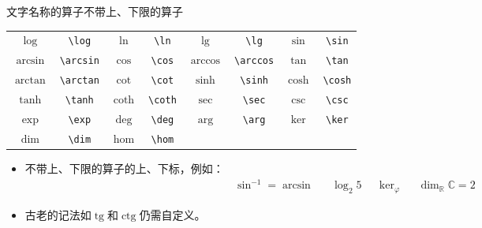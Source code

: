 \documentclass[mathserif]{beamer}
\newcommand{\real}{\mathbb R}
\newcommand{\complex}{\mathbb C}
\DeclareMathOperator{\tg}{tg}
\DeclareMathOperator{\ctg}{ctg}
\begin{document}
\begin{frame}[fragile]{文字名称的算子}{不带上、下限的算子}
\begin{table}[H]
\centering
\begin{tabular}{cc|cc|cc|cc}
	\toprule
	$\log$ & \lstinline'\log' & $\ln$ & \lstinline'\ln' & $\lg$ & \lstinline'\lg' & $\sin$ & \lstinline'\sin' \\
	$\arcsin$ & \lstinline'\arcsin' & $\cos$ & \lstinline'\cos' & $\arccos$ & \lstinline'\arccos' & $\tan$ & \lstinline'\tan' \\
	$\arctan$ & \lstinline'\arctan' & $\cot$ & \lstinline'\cot' & $\sinh$ & \lstinline'\sinh' & $\cosh$ & \lstinline'\cosh' \\
	$\tanh$ & \lstinline'\tanh' & $\coth$ & \lstinline'\coth' & $\sec$ & \lstinline'\sec' & $\csc$ & \lstinline'\csc' \\
	$\exp$ & \lstinline'\exp' & $\deg$ & \lstinline'\deg' & $\arg$ & \lstinline'\arg' & $\ker$ & \lstinline'\ker' \\
	$\dim$ & \lstinline'\dim' & $\hom$ & \lstinline'\hom' & ~ & ~ & ~ & ~ \\
	\bottomrule
\end{tabular}
\end{table}
\begin{itemize}

\item 不带上、下限的算子的上、下标，例如：
\begin{equation*}
	\begin{aligned}
	\sin^{-1} = \arcsin && \log_{2} 5 && \ker_{\varphi} && \dim_{\real} \complex = 2
	\end{aligned}
\end{equation*}

\item 古老的记法如$\tg$和$\ctg$仍需自定义。

\end{itemize}
\end{frame}
\end{document}
